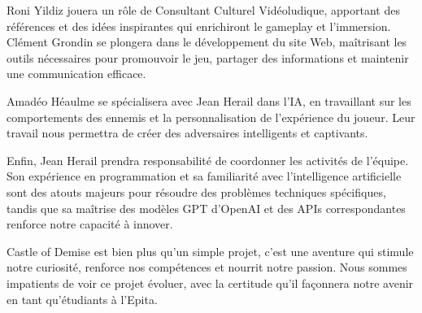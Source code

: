 \documentclass{report}
\begin{document}
Roni Yildiz jouera un rôle de Consultant Culturel Vidéoludique, apportant des références et des idées inspirantes qui enrichiront le gameplay et l’immersion. Clément Grondin se plongera dans le développement du site Web, maîtrisant les outils nécessaires pour promouvoir le jeu, partager des informations et maintenir une communication efficace. \newline

Amadéo Héaulme se spécialisera avec Jean Herail dans l’IA, en travaillant sur les comportements des ennemis et la personnalisation de l’expérience du joueur. Leur travail nous permettra de créer des adversaires intelligents et captivants. \newline

Enfin, Jean Herail prendra responsabilité de coordonner les activités de l’équipe. Son expérience en programmation et sa familiarité avec l’intelligence artificielle sont des atouts majeurs pour résoudre des problèmes techniques spécifiques, tandis que sa maîtrise des modèles GPT d’OpenAI et des APIs correspondantes renforce notre capacité à innover. \newline

Castle of Demise est bien plus qu’un simple projet, c’est une aventure qui stimule notre curiosité, renforce nos compétences et nourrit notre passion. Nous sommes impatients de voir ce projet évoluer, avec la certitude qu’il façonnera notre avenir en tant qu’étudiants à l’Epita.
\end{document}
